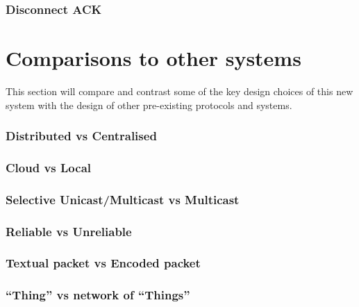 
\subsubsection{Disconnect ACK} %
\label{ssub:disconnect_ack}






\section{Comparisons to other systems}
This section will compare and contrast some of the key design choices of this new system with the design of other pre-existing protocols and systems. 

\subsubsection{Distributed vs Centralised} %
\label{ssub:distributed_vs_centralised}

\subsubsection{Cloud vs Local} %
\label{ssub:cloud_vs_local}

\subsubsection{Selective Unicast/Multicast vs Multicast} %
\label{ssub:selective_unicast_multicast_vs_multicast}

\subsubsection{Reliable vs Unreliable} %
\label{ssub:reliable_vs_unreliable}


\subsubsection{Textual packet vs Encoded packet} %
\label{ssub:textual_packet_vs_encoded_packet}

\subsubsection{``Thing'' vs network of ``Things''} %
\label{ssub:_thing_vs_network_of_things_}

